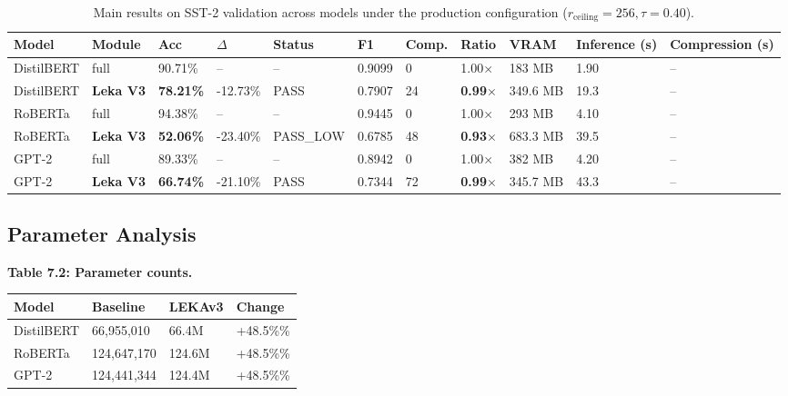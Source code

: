 \begin{table}[t]
\centering
\small
\begin{tabular}{lllllllllll}
\toprule
\textbf{Model} & \textbf{Module} & \textbf{Acc} & \textbf{$\Delta$} & \textbf{Status} & \textbf{F1} & \textbf{Comp.} & \textbf{Ratio} & \textbf{VRAM} & \textbf{Inference (s)} & \textbf{Compression (s)} \\
\midrule
DistilBERT & full & 90.71\% & -- & -- & 0.9099 & 0 & 1.00$\times$ & 183 MB & 1.90 & -- \\
DistilBERT & \textbf{Leka V3} & \textbf{78.21\%} & -12.73\% & PASS & 0.7907 & 24 & \textbf{0.99$\times$} & 349.6 MB & 19.3 & -- \\
RoBERTa & full & 94.38\% & -- & -- & 0.9445 & 0 & 1.00$\times$ & 293 MB & 4.10 & -- \\
RoBERTa & \textbf{Leka V3} & \textbf{52.06\%} & -23.40\% & PASS\_LOW & 0.6785 & 48 & \textbf{0.93$\times$} & 683.3 MB & 39.5 & -- \\
GPT-2 & full & 89.33\% & -- & -- & 0.8942 & 0 & 1.00$\times$ & 382 MB & 4.20 & -- \\
GPT-2 & \textbf{Leka V3} & \textbf{66.74\%} & -21.10\% & PASS & 0.7344 & 72 & \textbf{0.99$\times$} & 345.7 MB & 43.3 & -- \\
\bottomrule
\end{tabular}
\caption{Main results on SST-2 validation across models under the production configuration ($r_{\mathrm{ceiling}}=256, \tau=0.40$).}
\label{tab:main_sst2}
\end{table}

\subsection{Parameter Analysis}

\textbf{Table 7.2: Parameter counts.}

\begin{table}[H]
\centering
\small
\begin{tabular}{llll}
\toprule
\textbf{Model} & \textbf{Baseline} & \textbf{LEKAv3} & \textbf{Change} \\
\midrule
DistilBERT & 66,955,010 & 66.4M & +48.5\%\% \\
RoBERTa & 124,647,170 & 124.6M & +48.5\%\% \\
GPT-2 & 124,441,344 & 124.4M & +48.5\%\% \\
\bottomrule
\end{tabular}
\end{table}

